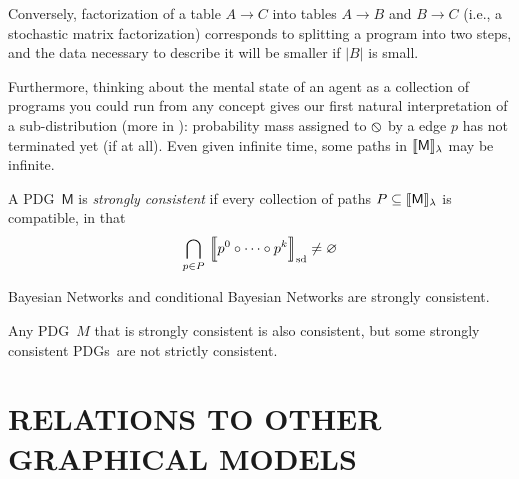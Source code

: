 \documentclass{article}
\newcommand\SD{_{\text{sd}}}
\newcommand{\none}{\varobslash}
\newcommand{\sfM}{\mathsf M}
\newcommand{\MN}{PDG}
\newcommand{\MNs}{\MN s}
\numberwithin{equation}{section}
\begin{document}
\begin{vfull}
\begin{example}
		Conversely, factorization of a table $A \to C$ into tables $A \to B$ and $B \to C$ (i.e., a stochastic matrix factorization) corresponds to splitting a program into two steps, and the data necessary to describe it will be smaller if $|B|$ is small.
	\end{example}	
	
	
	Furthermore, thinking about the mental state of an agent as a collection of programs you could run from any concept gives our first natural interpretation of a sub-distribution (more in ): probability mass assigned to $\none$ by a edge $p$ has not terminated yet (if at all). 
	Even given infinite time, some paths in $\bbr{\sfM}_\lambda$ may be infinite.
	
	\begin{defn}
		A \MN\ $\sfM$ is \emph{strongly consistent} if every collection of paths $P \subseteq \bbr{\sfM}_\lambda$ is compatible, in that 
		$$\bigcap_{p \in P}\ \bbr*{\vphantom{\Big|}p^0\circ \cdots\circ p^k}\SD \neq \varnothing$$
	\end{defn}

	\begin{example}
		Bayesian Networks and conditional Bayesian Networks are strongly consistent.
	\end{example}

	\begin{prop}
		Any \MN\ $M$ that is strongly consistent is also consistent, but some strongly consistent \MNs\ are not strictly consistent.
	\end{prop}




	\end{vfull}


	\section{RELATIONS TO OTHER GRAPHICAL MODELS}\label{sec:other-graphical-models}
	
\end{document}
